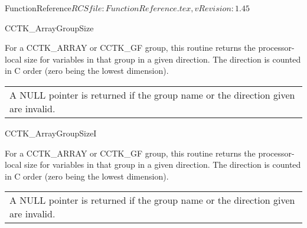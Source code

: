 \begin{cactuspart}{5}{FunctionReference}{$RCSfile: FunctionReference.tex,v $}{$Revision: 1.45 $}
\begin{CCTKFunc}{CCTK\_ArrayGroupSize}{}
\label{CCTK-ArrayGroupSize}
\showcargs
\begin{params}
\end{params}
\begin{discussion}
For a CCTK\_ARRAY or CCTK\_GF group, this routine returns the processor-local
size for variables in that group in a given direction. The direction is counted
in C order (zero being the lowest dimension).
\end{discussion}
\begin{errorcodes}
\begin{tabular}{l}
A NULL pointer is returned if the group name or the direction given are invalid.
\end{tabular}
\end{errorcodes}
\end{CCTKFunc}


\begin{CCTKFunc}{CCTK\_ArrayGroupSizeI}{}
\label{CCTK-ArrayGroupSizeI}
\showcargs
\begin{params}
\end{params}
\begin{discussion}
For a CCTK\_ARRAY or CCTK\_GF group, this routine returns the processor-local
size for variables in that group in a given direction. The direction is counted
in C order (zero being the lowest dimension).
\end{discussion}
\begin{errorcodes}
\begin{tabular}{l}
A NULL pointer is returned if the group name or the direction given are invalid.
\end{tabular}
\end{errorcodes}
\end{CCTKFunc}


\end{cactuspart}
